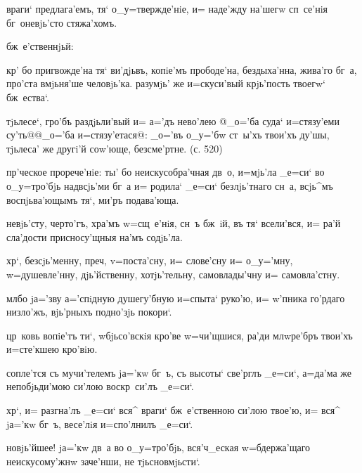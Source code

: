 враги` предлага'емъ, тя` о_у=твержде'нiе, и= наде'жду 
на'шегw сп~се'нiя бг~оневjь'сто стяжа'хомъ.

бж~е'ственнjьй:

кр' бо пригвожде'на тя` ви'дjьвъ, копiе'мъ 
прободе'на, бездыха'нна, жива'го бг~а, про'ста вмjьня'ше 
человjь'ка. разумjь' же и=скуси'вый крjь'пость твоегw` 
бж~ества`.

тjьлесе`, гро'бъ раздjьли'вый и= а='дъ нево'лею @_о='ба 
суда` и=стязу'еми су'ть@{@_о='ба и=стязу'етася@}: _о='въ 
о_у='бw ст~ы'хъ твои'хъ ду'шы, тjьлеса' же другi'й 
соw'юще, безсме'ртне. (с. 520)

пр'ческое прорече'нiе: ты' бо неискусобра'чная дв~о, 
и=мjь'ла _е=си` во о_у=тро'бjь над\ъ всjь'ми бг~а и= 
родила` _е=си` безлjь'тнаго сн~а, всjь^мъ воспjьва'ющымъ 
тя`, ми'ръ подава'юща.


невjь'сту, черто'гъ, хра'мъ w=сщ~е'нiя, сн~ъ бж~iй, въ 
тя` всели'вся, и= ра'й сла'дости присносу'щныя на'мъ 
содjь'ла.

хр`, безсjь'менну, преч, v=поста'сну, и= 
слове'сну и= о_у='мну, w=душевле'нну, дjь'йственну, 
хотjь'тельну, самовлады'чну и= самовла'стну.

мл бо jа='зву а='спiдную душегу'бную и=спыта` 
руко'ю, и= w'пника го'рдаго низло'жъ, вjь'рныхъ 
под\ъ но'зjь покори`.


цр~ковь вопiе'тъ ти`, w\т бjьсо'вскiя кро'ве w=чи'щшися, 
ра'ди мл w\т ре'бръ твои'хъ и=сте'кшею кро'вiю.

сопле'тся съ мучи'телемъ jа='кw бг~ъ, съ высоты` све'рглъ 
_е=си`, а=да'ма же непобjьди'мою си'лою воскр~си'лъ 
_е=си`.

хр`, и= разгна'лъ _е=си` вся^ враги` бж~е'ственною 
си'лою твое'ю, и= вся^ jа='кw бг~ъ, весе'лiя и=спо'лнилъ 
_е=си`.

новjь'йшее! jа='кw дв~а во о_у=тро'бjь, вся'ч_еская 
w=бдержа'щаго неискусому'жнw заче'нши, не тjьсновмjьсти`.

